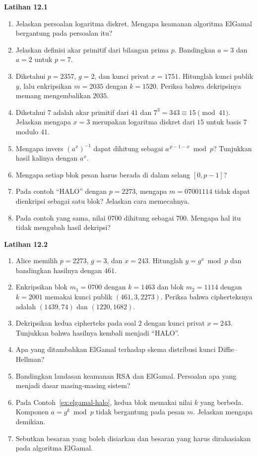 
\begin{obereflection}
\textbf{Latihan 12.1}
\begin{enumerate}
    \item Jelaskan persoalan logaritma diskret. Mengapa keamanan algoritma
          ElGamal bergantung pada persoalan itu?
    \item Jelaskan definisi akar primitif dari bilangan prima $p$. Bandingkan
          $a = 3$ dan $a = 2$ untuk $p = 7$.
    \item Diketahui $p = 2357$, $g = 2$, dan kunci privat $x = 1751$. Hitunglah
          kunci publik $y$, lalu enkripsikan $m = 2035$ dengan $k = 1520$.
          Periksa bahwa dekripsinya memang mengembalikan $2035$.
    \item Diketahui $7$ adalah akar primitif dari $41$ dan $7^{3} = 343 \equiv 15
          \pmod{41}$. Jelaskan mengapa $x = 3$ merupakan logaritma diskret dari
          $15$ untuk basis $7$ modulo $41$.
    \item Mengapa invers $\left(a^{x}\right)^{-1}$ dapat dihitung sebagai
          $a^{\,p-1-x} \bmod p$? Tunjukkan hasil kalinya dengan $a^{x}$.
    \item Mengapa setiap blok pesan harus berada di dalam selang $[0, p-1]$?
    \item Pada contoh ``HALO'' dengan $p = 2273$, mengapa $m = 07001114$ tidak
          dapat dienkripsi sebagai satu blok? Jelaskan cara memecahnya.
    \item Pada contoh yang sama, nilai $0700$ dihitung sebagai $700$. Mengapa
          hal itu tidak mengubah hasil dekripsi?
\end{enumerate}
\end{obereflection}

\begin{obereflection}
\textbf{Latihan 12.2}
\begin{enumerate}
    \item Alice memilih $p = 2273$, $g = 3$, dan $x = 243$. Hitunglah
          $y = g^{x} \bmod p$ dan bandingkan hasilnya dengan $461$.
    \item Enkripsikan blok $m_{1} = 0700$ dengan $k = 1463$ dan blok
          $m_{2} = 1114$ dengan $k = 2001$ memakai kunci publik
          $(461, 3, 2273)$. Periksa bahwa cipherteksnya adalah $(1439, 74)$ dan
          $(1220, 1682)$.
    \item Dekripsikan kedua cipherteks pada soal 2 dengan kunci privat
          $x = 243$. Tunjukkan bahwa hasilnya kembali menjadi ``HALO''.
    \item Apa yang ditambahkan ElGamal terhadap skema distribusi kunci
          Diffie--Hellman?
    \item Bandingkan landasan keamanan RSA dan ElGamal. Persoalan apa yang
          menjadi dasar masing-masing sistem?
    \item Pada Contoh~\ref{ex:elgamal-halo}, kedua blok memakai nilai $k$ yang
          berbeda. Komponen $a = g^{k} \bmod p$ tidak bergantung pada pesan
          $m$. Jelaskan mengapa demikian.
    \item Sebutkan besaran yang boleh disiarkan dan besaran yang harus
          dirahasiakan pada algoritma ElGamal.
\end{enumerate}
\end{obereflection}
